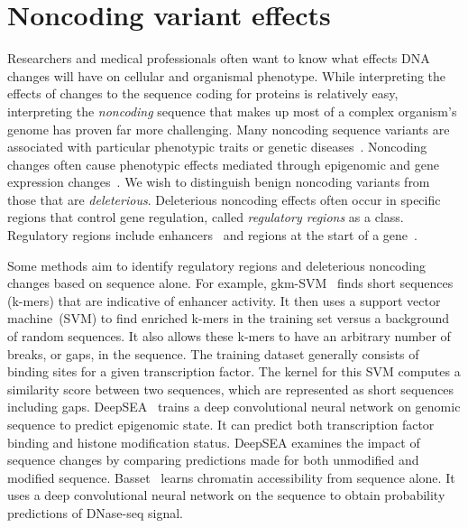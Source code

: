 \documentclass[5p]{elsarticle}
\newcommand{\rev}[1]{{\color{black}#1}}
\begin{document}
\section{Noncoding variant effects}\label{sec:noncoding}

Researchers and medical professionals often want to know what effects DNA changes will have on cellular and organismal phenotype.
While interpreting the effects of changes to the sequence coding for proteins is relatively easy, interpreting the \emph{noncoding} sequence that makes up most of a complex organism's genome has proven far more challenging.
Many noncoding sequence variants are associated with particular phenotypic traits or genetic diseases~\cite{Hindorff2009PotentialTraits}.
Noncoding changes often cause phenotypic effects mediated through epigenomic and gene expression changes~\cite{Prensner2011TheBiology}.
We wish to distinguish benign noncoding variants from those that are \emph{deleterious}.
Deleterious noncoding effects often occur in specific regions that control gene regulation, called \emph{regulatory regions} as a class.
Regulatory regions include enhancers~\cite{Shlyueva2014TranscriptionalPredictions} and regions at the start of a gene~\cite{Riethoven2010RegulatoryInsulators}.

Some methods aim to identify regulatory regions and deleterious noncoding changes based on sequence alone.
For example, gkm-SVM~\cite{Ghandi2016GkmSVM:SVM,Ghandi2014EnhancedFeatures} \rev{finds} short sequences (k-mers) that are indicative of enhancer activity.
It then uses a support vector machine~(SVM) to find enriched k-mers in the training set versus a background of random sequences.
It also allows these k-mers to have an arbitrary number of breaks, or gaps, in the sequence.
The training dataset generally consists of binding sites for a given transcription factor.
The kernel for this SVM computes a similarity score between two sequences, which are represented as short sequences including gaps.
DeepSEA~\cite{Zhou2015PredictingModel} trains a deep convolutional neural network on genomic sequence to predict epigenomic state.
It can predict both transcription factor binding and histone modification status.
DeepSEA examines the impact of sequence changes by comparing predictions made for both unmodified and modified sequence.
Basset~\cite{Kelley2016Basset:Networks} learns chromatin accessibility from sequence alone.
It uses a deep convolutional neural network on the sequence to obtain probability predictions of DNase-seq signal.
\end{document}
